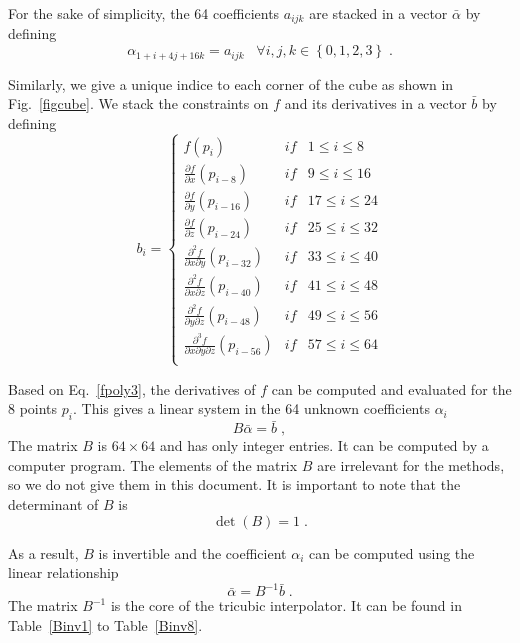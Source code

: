 \documentclass{article}
\begin{document}
For the sake of simplicity, the 64 coefficients $a_{i j k}$ are stacked in a vector $\bar{\alpha }$ by defining
\begin{equation}
\alpha _{1+i+4 j+16 k} = a_{i j k} \; \; \; \forall i,j,k \in \left\{ 0 , 1 ,2 ,3 \right\} \; .
\end{equation}

\noindent Similarly, we give a unique indice to each corner of the cube as shown in Fig.~\ref{figcube}. We stack the constraints on $f$ and its derivatives in a vector $\bar{b}$ by defining
\begin{equation}
b_i = \left\{
\begin{array}{lcl}
f(p_i)&if&1\leq i \leq 8\\
\frac{\partial f}{\partial x}(p_{i-8})&if&9\leq i \leq 16\\
\frac{\partial f}{\partial y}(p_{i-16})&if&17\leq i \leq 24\\
\frac{\partial f}{\partial z}(p_{i-24})&if&25\leq i \leq 32\\
\frac{\partial ^2 f}{\partial x \partial y}(p_{i-32})&if&33\leq i \leq 40\\
\frac{\partial ^2 f}{\partial x \partial z}(p_{i-40})&if&41\leq i \leq 48\\
\frac{\partial ^2 f}{\partial y \partial z}(p_{i-48})&if&49\leq i \leq 56\\
\frac{\partial ^3 f}{\partial x \partial y \partial z}(p_{i-56})&if&57\leq i \leq 64\\
\end{array}
\right.
\end{equation}

\noindent Based on Eq.~\ref{fpoly3}, the derivatives of $f$ can be computed and evaluated for the $8$ points $p_i$. This gives a linear system in the 64 unknown coefficients $\alpha _i$
\begin{equation}
B \bar{\alpha } = \bar{b} \; ,
\end{equation} The matrix $B$ is $64\times 64 $ and has only integer entries. It can be computed by a computer program. The elements of the matrix $B$ are irrelevant for the methods, so we do not give them in this document. It is important to note that the determinant of $B$ is
\begin{equation}
\det \left( B \right) = 1 \; .
\end{equation}

\noindent As a result, $B$ is invertible and the coefficient $\alpha _i$ can be computed using the linear relationship
\begin{equation}
\bar{\alpha } = B^{-1} \bar{b} \; . 
\label{Binv}
\end{equation} The matrix $B^{-1}$ is the core of the tricubic interpolator. It can be found in Table~\ref{Binv1} to Table~\ref{Binv8}.
\end{document}
